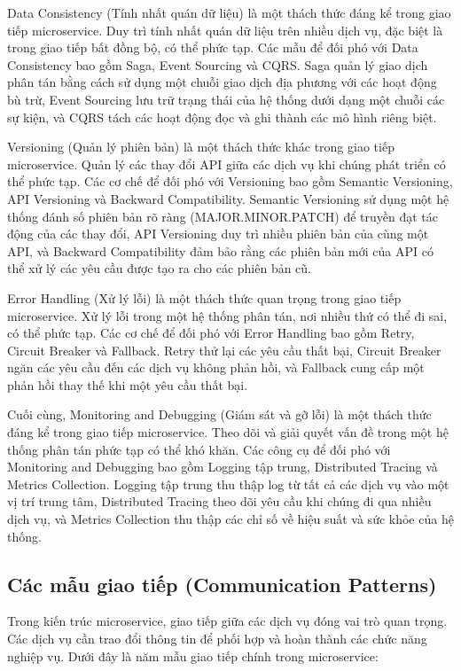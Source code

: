 Data Consistency (Tính nhất quán dữ liệu) là một thách thức đáng kể trong giao
tiếp microservice. Duy trì tính nhất quán dữ liệu trên nhiều dịch vụ, đặc biệt
là trong giao tiếp bất đồng bộ, có thể phức tạp. Các mẫu để đối phó với Data
Consistency bao gồm Saga, Event Sourcing và CQRS. Saga quản lý giao dịch phân
tán bằng cách sử dụng một chuỗi giao dịch địa phương với các hoạt động bù trừ,
Event Sourcing lưu trữ trạng thái của hệ thống dưới dạng một chuỗi các sự kiện,
và CQRS tách các hoạt động đọc và ghi thành các mô hình riêng biệt.

Versioning (Quản lý phiên bản) là một thách thức khác trong giao tiếp
microservice. Quản lý các thay đổi API giữa các dịch vụ khi chúng phát triển có
thể phức tạp. Các cơ chế để đối phó với Versioning bao gồm Semantic Versioning,
API Versioning và Backward Compatibility. Semantic Versioning sử dụng một hệ
thống đánh số phiên bản rõ ràng (MAJOR.MINOR.PATCH) để truyền đạt tác động của
các thay đổi, API Versioning duy trì nhiều phiên bản của cùng một API, và
Backward Compatibility đảm bảo rằng các phiên bản mới của API có thể xử lý các
yêu cầu được tạo ra cho các phiên bản cũ.

Error Handling (Xử lý lỗi) là một thách thức quan trọng trong giao tiếp
microservice. Xử lý lỗi trong một hệ thống phân tán, nơi nhiều thứ có thể đi
sai, có thể phức tạp. Các cơ chế để đối phó với Error Handling bao gồm Retry,
Circuit Breaker và Fallback. Retry thử lại các yêu cầu thất bại, Circuit
Breaker ngăn các yêu cầu đến các dịch vụ không phản hồi, và Fallback cung cấp
một phản hồi thay thế khi một yêu cầu thất bại.

Cuối cùng, Monitoring and Debugging (Giám sát và gỡ lỗi) là một thách thức đáng
kể trong giao tiếp microservice. Theo dõi và giải quyết vấn đề trong một hệ
thống phân tán phức tạp có thể khó khăn. Các công cụ để đối phó với Monitoring
and Debugging bao gồm Logging tập trung, Distributed Tracing và Metrics
Collection. Logging tập trung thu thập log từ tất cả các dịch vụ vào một vị trí
trung tâm, Distributed Tracing theo dõi yêu cầu khi chúng đi qua nhiều dịch vụ,
và Metrics Collection thu thập các chỉ số về hiệu suất và sức khỏe của hệ
thống.

\subsection{Các mẫu giao tiếp (Communication Patterns)}
Trong kiến trúc microservice, giao tiếp giữa các dịch vụ đóng vai trò quan trọng. Các dịch vụ cần trao đổi thông tin để phối hợp và hoàn thành các chức năng nghiệp vụ. Dưới đây là năm mẫu giao tiếp chính trong microservice:

